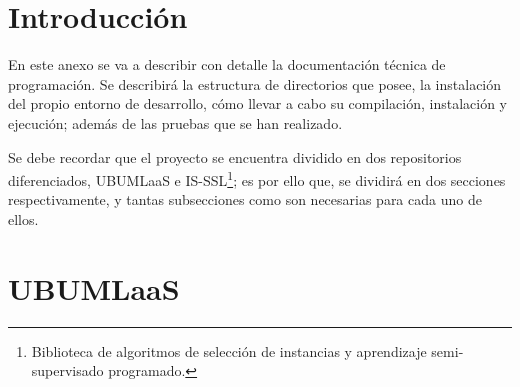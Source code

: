 
\section{Introducción}
En este anexo se va a describir con detalle la documentación técnica de programación. Se describirá la estructura de directorios que posee, la instalación del propio entorno de desarrollo, cómo llevar a cabo su compilación, instalación y ejecución; además de las pruebas que se han realizado.

Se debe recordar que el proyecto se encuentra dividido en dos repositorios diferenciados, UBUMLaaS e IS-SSL\footnote{Biblioteca de algoritmos de selección de instancias y aprendizaje semi-supervisado programado.}; es por ello que, se dividirá en dos secciones respectivamente, y tantas subsecciones como son necesarias para cada uno de ellos.

\section{UBUMLaaS}

